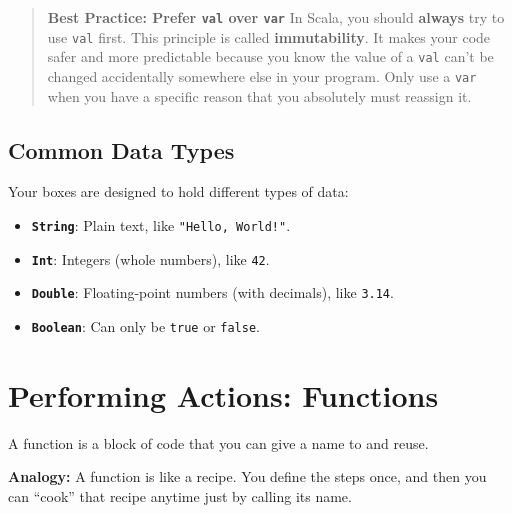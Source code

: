 \documentclass[
  letterpaper,
  DIV=11,
  numbers=noendperiod]{scrreprt}
\newenvironment{Shaded}{\begin{snugshade}}{\end{snugshade}}
\newcommand{\BuiltInTok}[1]{\textcolor[rgb]{0.00,0.23,0.31}{#1}}
\newcommand{\CommentTok}[1]{\textcolor[rgb]{0.37,0.37,0.37}{#1}}
\newcommand{\ExtensionTok}[1]{\textcolor[rgb]{0.00,0.23,0.31}{#1}}
\newcommand{\FunctionTok}[1]{\textcolor[rgb]{0.28,0.35,0.67}{#1}}
\newcommand{\KeywordTok}[1]{\textcolor[rgb]{0.00,0.23,0.31}{\textbf{#1}}}
\newcommand{\NormalTok}[1]{\textcolor[rgb]{0.00,0.23,0.31}{#1}}
\newcommand{\OperatorTok}[1]{\textcolor[rgb]{0.37,0.37,0.37}{#1}}
\newcommand{\SpecialStringTok}[1]{\textcolor[rgb]{0.13,0.47,0.30}{#1}}
\newcommand{\StringTok}[1]{\textcolor[rgb]{0.13,0.47,0.30}{#1}}
\providecommand{\tightlist}{%
  \setlength{\itemsep}{0pt}\setlength{\parskip}{0pt}}
\begin{document}
\begin{quote}
\textbf{Best Practice: Prefer \texttt{val} over \texttt{var}} In Scala,
you should \textbf{always} try to use \texttt{val} first. This principle
is called \textbf{immutability}. It makes your code safer and more
predictable because you know the value of a \texttt{val} can't be
changed accidentally somewhere else in your program. Only use a
\texttt{var} when you have a specific reason that you absolutely must
reassign it.
\end{quote}

\subsection{Common Data Types}\label{common-data-types}

Your boxes are designed to hold different types of data:

\begin{itemize}
\tightlist
\item
  \textbf{\texttt{String}}: Plain text, like \texttt{"Hello,\ World!"}.
\item
  \textbf{\texttt{Int}}: Integers (whole numbers), like \texttt{42}.
\item
  \textbf{\texttt{Double}}: Floating-point numbers (with decimals), like
  \texttt{3.14}.
\item
  \textbf{\texttt{Boolean}}: Can only be \texttt{true} or
  \texttt{false}.
\end{itemize}

\section{Performing Actions:
Functions}\label{performing-actions-functions}

A function is a block of code that you can give a name to and reuse.

\textbf{Analogy:} A function is like a recipe. You define the steps
once, and then you can ``cook'' that recipe anytime just by calling its
name.

\begin{Shaded}
\end{Shaded}
\end{document}
